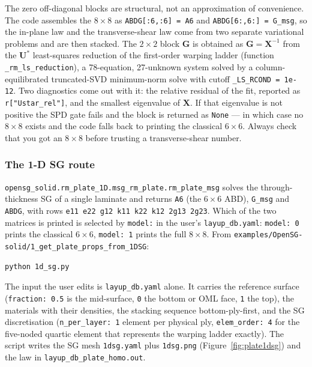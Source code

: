 The zero off-diagonal blocks are structural, not an approximation of
convenience. The code assembles the $8\times8$ as \verb|ABDG[:6,:6] = A6| and
\verb|ABDG[6:,6:] = G_msg|, so the in-plane law and the transverse-shear law
come from two separate variational problems and are then stacked. The
$2\times2$ block $\mathbf G$ is obtained as $\mathbf G = \mathbf X^{-1}$ from
the $\mathbf U^*$ least-squares reduction of the first-order warping ladder
(function \texttt{\_rm\_ls\_reduction}), a 78-equation, 27-unknown system solved
by a column-equilibrated truncated-SVD minimum-norm solve with cutoff
\texttt{\_LS\_RCOND = 1e-12}. Two diagnostics come out with it: the relative
residual of the fit, reported as \texttt{r["Ustar\_rel"]}, and the smallest
eigenvalue of $\mathbf X$. If that eigenvalue is not positive the SPD gate
fails and the block is returned as \texttt{None} --- in which case no
$8\times8$ exists and the code falls back to printing the classical
$6\times6$. Always check that you got an $8\times8$ before trusting a
transverse-shear number.

\subsubsection{The 1-D SG route}

\texttt{opensg\_solid.rm\_plate\_1D.msg\_rm\_plate.rm\_plate\_msg} solves the
through-thickness SG of a single laminate and returns \texttt{A6} (the
$6\times6$ ABD), \texttt{G\_msg} and \texttt{ABDG}, with rows
\verb|e11 e22 g12 k11 k22 k12 2g13 2g23|. Which of the two matrices is printed
is selected by \texttt{model:} in the user's \texttt{layup\_db.yaml}:
\texttt{model: 0} prints the classical $6\times6$, \texttt{model: 1} prints the
full $8\times8$. From
\texttt{examples/OpenSG-solid/1\_get\_plate\_props\_from\_1DSG}:

\begin{lstlisting}[style=shellst]
python 1d_sg.py
\end{lstlisting}

The input the user edits is \texttt{layup\_db.yaml} alone. It carries the
reference surface (\texttt{fraction: 0.5} is the mid-surface, \texttt{0} the
bottom or OML face, \texttt{1} the top), the materials with their densities,
the stacking sequence bottom-ply-first, and the SG discretisation
(\texttt{n\_per\_layer: 1} element per physical ply, \texttt{elem\_order: 4} for
the five-noded quartic element that represents the warping ladder exactly).
The script writes the SG mesh \texttt{1dsg.yaml} plus
\texttt{1dsg.png} (Figure~\ref{fig:plate1dsg}) and the law in
\texttt{layup\_db\_plate\_homo.out}.

